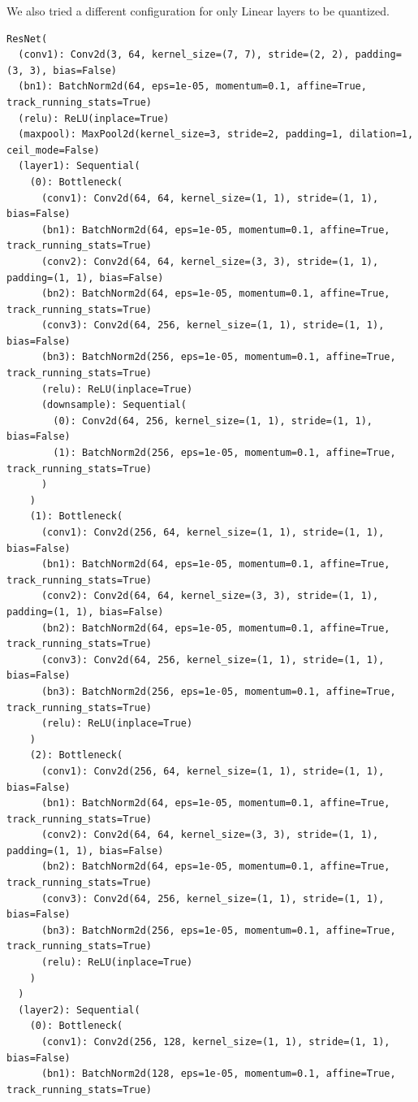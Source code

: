 \documentclass{article}
\begin{document}
We also tried a different configuration for only Linear layers to be quantized. 
\begin{verbatim}
ResNet(
  (conv1): Conv2d(3, 64, kernel_size=(7, 7), stride=(2, 2), padding=(3, 3), bias=False)
  (bn1): BatchNorm2d(64, eps=1e-05, momentum=0.1, affine=True, track_running_stats=True)
  (relu): ReLU(inplace=True)
  (maxpool): MaxPool2d(kernel_size=3, stride=2, padding=1, dilation=1, ceil_mode=False)
  (layer1): Sequential(
    (0): Bottleneck(
      (conv1): Conv2d(64, 64, kernel_size=(1, 1), stride=(1, 1), bias=False)
      (bn1): BatchNorm2d(64, eps=1e-05, momentum=0.1, affine=True, track_running_stats=True)
      (conv2): Conv2d(64, 64, kernel_size=(3, 3), stride=(1, 1), padding=(1, 1), bias=False)
      (bn2): BatchNorm2d(64, eps=1e-05, momentum=0.1, affine=True, track_running_stats=True)
      (conv3): Conv2d(64, 256, kernel_size=(1, 1), stride=(1, 1), bias=False)
      (bn3): BatchNorm2d(256, eps=1e-05, momentum=0.1, affine=True, track_running_stats=True)
      (relu): ReLU(inplace=True)
      (downsample): Sequential(
        (0): Conv2d(64, 256, kernel_size=(1, 1), stride=(1, 1), bias=False)
        (1): BatchNorm2d(256, eps=1e-05, momentum=0.1, affine=True, track_running_stats=True)
      )
    )
    (1): Bottleneck(
      (conv1): Conv2d(256, 64, kernel_size=(1, 1), stride=(1, 1), bias=False)
      (bn1): BatchNorm2d(64, eps=1e-05, momentum=0.1, affine=True, track_running_stats=True)
      (conv2): Conv2d(64, 64, kernel_size=(3, 3), stride=(1, 1), padding=(1, 1), bias=False)
      (bn2): BatchNorm2d(64, eps=1e-05, momentum=0.1, affine=True, track_running_stats=True)
      (conv3): Conv2d(64, 256, kernel_size=(1, 1), stride=(1, 1), bias=False)
      (bn3): BatchNorm2d(256, eps=1e-05, momentum=0.1, affine=True, track_running_stats=True)
      (relu): ReLU(inplace=True)
    )
    (2): Bottleneck(
      (conv1): Conv2d(256, 64, kernel_size=(1, 1), stride=(1, 1), bias=False)
      (bn1): BatchNorm2d(64, eps=1e-05, momentum=0.1, affine=True, track_running_stats=True)
      (conv2): Conv2d(64, 64, kernel_size=(3, 3), stride=(1, 1), padding=(1, 1), bias=False)
      (bn2): BatchNorm2d(64, eps=1e-05, momentum=0.1, affine=True, track_running_stats=True)
      (conv3): Conv2d(64, 256, kernel_size=(1, 1), stride=(1, 1), bias=False)
      (bn3): BatchNorm2d(256, eps=1e-05, momentum=0.1, affine=True, track_running_stats=True)
      (relu): ReLU(inplace=True)
    )
  )
  (layer2): Sequential(
    (0): Bottleneck(
      (conv1): Conv2d(256, 128, kernel_size=(1, 1), stride=(1, 1), bias=False)
      (bn1): BatchNorm2d(128, eps=1e-05, momentum=0.1, affine=True, track_running_stats=True)

\end{verbatim}
\end{document}
